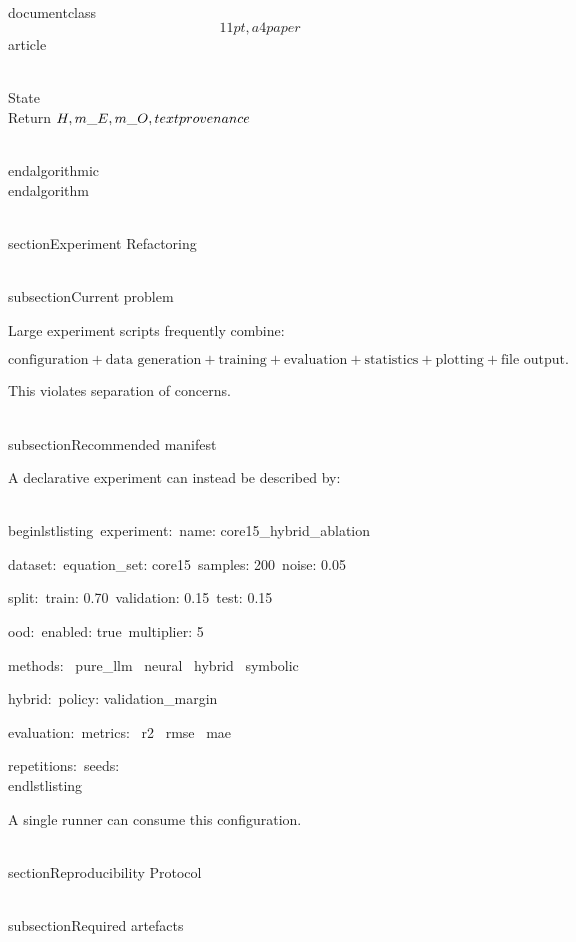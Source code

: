 \\documentclass\[11pt,a4paper\]{article}
\begin{document}
 \\State \\Return $H,m\_E,m\_O,\\text{provenance}$

 \\end{algorithmic}\
 \\end{algorithm}

 \\section{Experiment Refactoring}\

 \\subsection{Current problem}

 Large experiment scripts frequently combine:

 $$
\text{configuration}
+
\text{data generation}
+
\text{training}
+
\text{evaluation}
+
\text{statistics}
+
\text{plotting}
+
\text{file output}.
$$

 This violates separation of concerns.

 \\subsection{Recommended manifest}

 A declarative experiment can instead be described by:

 \\begin{lstlisting}\
 experiment:\
 name: core15\_hybrid\_ablation

 dataset:\
 equation\_set: core15\
 samples: 200\
 noise: 0.05

 split:\
 train: 0.70\
 validation: 0.15\
 test: 0.15

 ood:\
 enabled: true\
 multiplier: 5

 methods:\
 \- pure\_llm\
 \- neural\
 \- hybrid\
 \- symbolic

 hybrid:\
 policy: validation\_margin

 evaluation:\
 metrics:\
 \- r2\
 \- rmse\
 \- mae

 repetitions:\
 seeds:\
 \
 \
 \
 \
 \
 \\end{lstlisting}

 A single runner can consume this configuration.

 \\section{Reproducibility Protocol}\

 \\subsection{Required artefacts}
\end{document}
